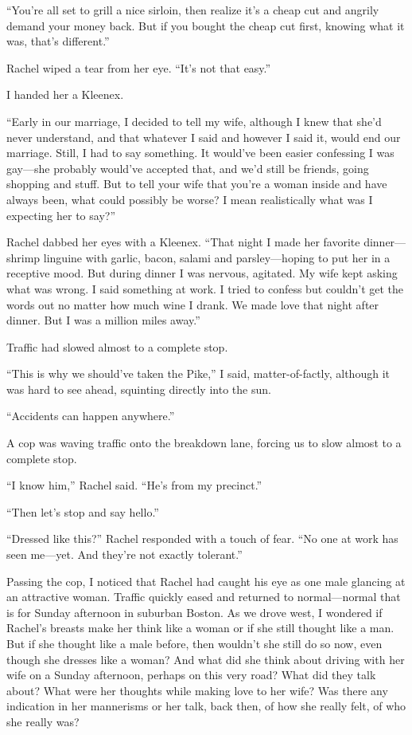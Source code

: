 ``You're all set to grill a nice sirloin, then realize it's a cheap cut
and angrily demand your money back. But if you bought the cheap cut
first, knowing what it was, that's different.''

Rachel wiped a tear from her eye. ``It's not that easy.''

I handed her a Kleenex.

``Early in our marriage, I decided to tell my wife, although I knew that
she'd never understand, and that whatever I said and however I said it,
would end our marriage. Still, I had to say something. It would've been
easier confessing I was gay---she probably would've accepted that, and
we'd still be friends, going shopping and stuff. But to tell your wife
that you're a woman inside and have always been, what could possibly be
worse? I mean realistically what was I expecting her to say?''

Rachel dabbed her eyes with a Kleenex. ``That night I made her favorite
dinner---shrimp linguine with garlic, bacon, salami and parsley---hoping
to put her in a receptive mood. But during dinner I was nervous,
agitated. My wife kept asking what was wrong. I said something at work.
I tried to confess but couldn't get the words out no matter how much
wine I drank. We made love that night after dinner. But I was a million
miles away.''

Traffic had slowed almost to a complete stop.

``This is why we should've taken the Pike,'' I said, matter-of-factly,
although it was hard to see ahead, squinting directly into the sun.

``Accidents can happen anywhere.''

A cop was waving traffic onto the breakdown lane, forcing us to slow
almost to a complete stop.

``I know him,'' Rachel said. ``He's from my precinct.''

``Then let's stop and say hello.''

``Dressed like this?'' Rachel responded with a touch of fear. ``No one
at work has seen me---yet. And they're not exactly tolerant.''

Passing the cop, I noticed that Rachel had caught his eye as one male
glancing at an attractive woman. Traffic quickly eased and returned to
normal---normal that is for Sunday afternoon in suburban Boston. As we
drove west, I wondered if Rachel's breasts make her think like a woman
or if she still thought like a man. But if she thought like a male
before, then wouldn't she still do so now, even though she dresses like
a woman? And what did she think about driving with her wife on a Sunday
afternoon, perhaps on this very road? What did they talk about? What
were her thoughts while making love to her wife? Was there any
indication in her mannerisms or her talk, back then, of how she really
felt, of who she really was?

